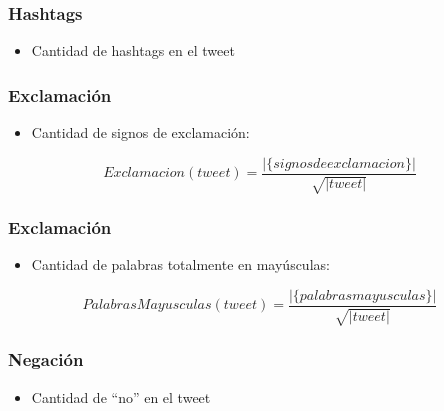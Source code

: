 \begin{frame}
    \frametitle{Hashtags}

    \begin{itemize}
        \item Cantidad de hashtags en el tweet
    \end{itemize}
\end{frame}

\begin{frame}
    \frametitle{Exclamación}

    \begin{itemize}
        \item Cantidad de signos de exclamación:
    \end{itemize}

    \begin{center}
        \[
            Exclamacion(tweet) = \frac{|\{signos de exclamacion\}|}{\sqrt{|tweet|}}
        \]
    \end{center}
\end{frame}

\begin{frame}
    \frametitle{Exclamación}

    \begin{itemize}
        \item Cantidad de palabras totalmente en mayúsculas:
    \end{itemize}

    \begin{center}
        \[
            PalabrasMayusculas(tweet) = \frac{|\{palabras mayusculas\}|}{\sqrt{|tweet|}}
        \]
    \end{center}
\end{frame}

\begin{frame}
    \frametitle{Negación}

    \begin{itemize}
        \item Cantidad de ``no'' en el tweet
    \end{itemize}
\end{frame}

